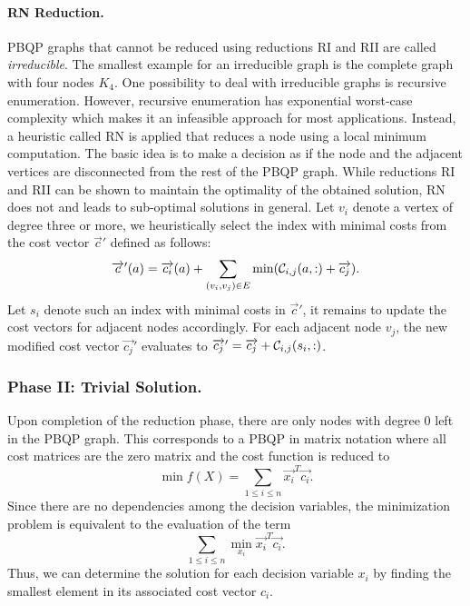 \paragraph{RN Reduction.}
PBQP graphs that cannot be reduced using reductions RI and RII are
called \emph{irreducible}. The smallest example for an irreducible
graph is the complete graph with four nodes $K_4$. One possibility to
deal with irreducible graphs is recursive enumeration. However,
recursive enumeration has exponential worst-case complexity which
makes it an infeasible approach for most applications. Instead, a
heuristic called RN is applied that reduces a node using a local
minimum computation. The basic idea is to make a decision as if the
node and the adjacent vertices are disconnected from the rest of the
PBQP graph. While reductions RI and RII can be shown to maintain the
optimality of the obtained solution, RN does not and leads to
sub-optimal solutions in general. Let $v_i$ denote a vertex of degree
three or more, we heuristically select the index with minimal costs
from the cost vector $\vec{c}'$ defined as follows:
$$\overrightarrow{c}'(a) = \overrightarrow{c_i}(a) + \sum_{(v_i,v_j) \in E}{\min({\mathcal C}_{i,j}(a,:)
  + \overrightarrow{c_j})}.$$ Let $s_i$ denote such an index with minimal costs
in $\vec{c}'$, it remains to update the cost vectors for adjacent
nodes accordingly. For each adjacent node $v_j$, the new modified cost
vector $\vec{c_j}'$ evaluates to $\overrightarrow{c_j}' = \overrightarrow{c_j} +
{\mathcal C}_{i,j}(s_i,:)$.

\subsubsection{Phase II: Trivial Solution.}
Upon completion of the reduction phase, there are only nodes with
degree $0$ left in the PBQP graph. This corresponds to a PBQP in
matrix notation where all cost matrices are the zero matrix and the
cost function is reduced to $$\min f(X) = \sum_{1 \leq i \leq n}
\vec{x_i}^{T} \vec{c_i}.$$ Since there are no dependencies among the
decision variables, the minimization problem is equivalent to the
evaluation of the term $$\sum_{1 \leq i \leq n} \min
_{x_i}\vec{x_i}^{T} \vec{c_i}.$$ Thus, we can determine the solution
for each decision variable $x_i$ by finding the smallest element in
its associated cost vector $c_i$.

